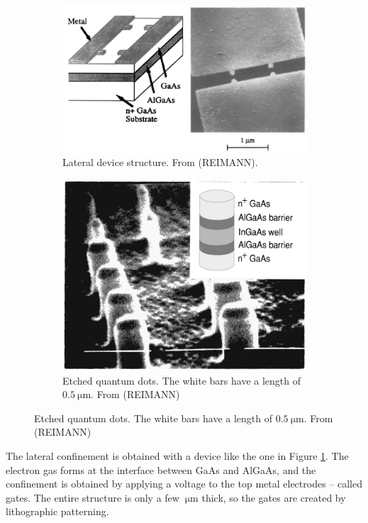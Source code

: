 \documentclass[a4paper,twoside,11pt]{book}
\begin{document}
\begin{figure}[H]
	\centering
	\begin{subfigure}[b]{0.5\textwidth}
		\includegraphics[width=\textwidth]{Figure_5_Reimann}
		\caption{Lateral device structure. From (REIMANN).}
		\label{fig:Figure_5_Reimann}
    \end{subfigure}
	\begin{subfigure}[b]{0.4\textwidth}
		\includegraphics[width=\textwidth]{Figure_4_Reimann}
		\caption{Etched quantum dots. The white bars have a length of $\SI{0.5}{\micro\meter}$. From (REIMANN)}
		\label{fig:Figure_4_Reimann}
    \end{subfigure}
	\label{fig:Figures_4-5_Reimann}
\end{figure}

The lateral confinement is obtained with a device like the one in Figure \ref{fig:Figure_5_Reimann}. The electron gas forms at the interface between GaAs and AlGaAs, and the confinement is obtained by applying a voltage to the top metal electrodes -- called gates. The entire structure is only a few $\SI{}{\micro\meter}$ thick, so the gates are created by lithographic patterning.
\end{document}
